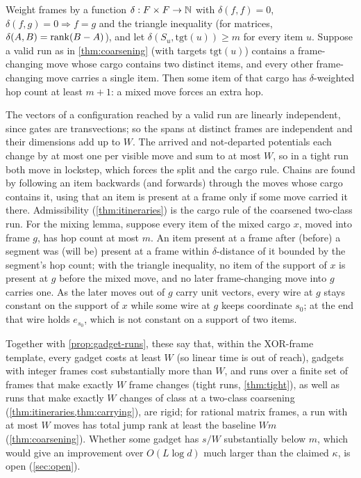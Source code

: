 \begin{theorem}\label{thm:mixing}
Weight frames by a function $\delta:F\times F\to\mathbb{N}$ with $\delta(f,f)=0$, $\delta(f,g)=0\Rightarrow f=g$ and the triangle inequality (for
matrices, $\delta(A,B)=\operatorname{rank}(B-A)$), and let $\delta(S_u,\mathrm{tgt}(u))\ge m$ for every item $u$. Suppose a
valid run as in \cref{thm:coarsening} (with targets $\mathrm{tgt}(u)$) contains a frame-changing move whose cargo contains two distinct items, and every other frame-changing move carries a single item. Then some item of that cargo has
$\delta$-weighted hop count at least $m+1$: a mixed move forces an extra hop.
\end{theorem}

\begin{outline}
The vectors of a configuration reached by a valid run are linearly independent, since gates are
transvections; so the spans at distinct frames are independent and their dimensions add up to $W$. The
arrived and not-departed potentials each change by at most one per visible move and sum to at most $W$, so in
a tight run both move in lockstep, which forces the split and the cargo rule. Chains are found by following an
item backwards (and forwards) through the moves whose cargo contains it, using that an item is present at a
frame only if some move carried it there. Admissibility (\cref{thm:itineraries}) is the cargo rule of the coarsened two-class run. For the mixing
lemma, suppose every item of the mixed cargo $x$, moved into frame $g$, has hop count at most $m$. An item
present at a frame after (before) a segment was (will be) present at a frame within $\delta$-distance of it
bounded by the segment's hop count; with the triangle inequality, no item of the support of $x$ is present at
$g$ before the mixed move, and no later frame-changing move into $g$ carries one. As the later moves out of
$g$ carry unit vectors, every wire at $g$ stays constant on the support of $x$ while some wire at $g$ keeps
coordinate $s_0$; at the end that wire holds $e_{s_0}$, which is not constant on a support of two items.
\end{outline}

Together with \cref{prop:gadget-runs}, these say that, within the XOR-frame template, every gadget costs at least $W$ (so linear time is out of reach), gadgets with integer frames cost substantially more than $W$, and runs over a finite set of frames that make exactly $W$ frame changes (tight runs, \cref{thm:tight}), as well as runs that make exactly $W$ changes of class at a two-class coarsening (\cref{thm:itineraries,thm:carrying}), are rigid; for rational matrix frames, a run with at most $W$ moves has total jump rank at least the baseline $Wm$ (\cref{thm:coarsening}). Whether some gadget has $s/W$ substantially below $m$, which would give an improvement
over $O(L\log d)$ much larger than the claimed $\kappa$, is open (\cref{sec:open}).
